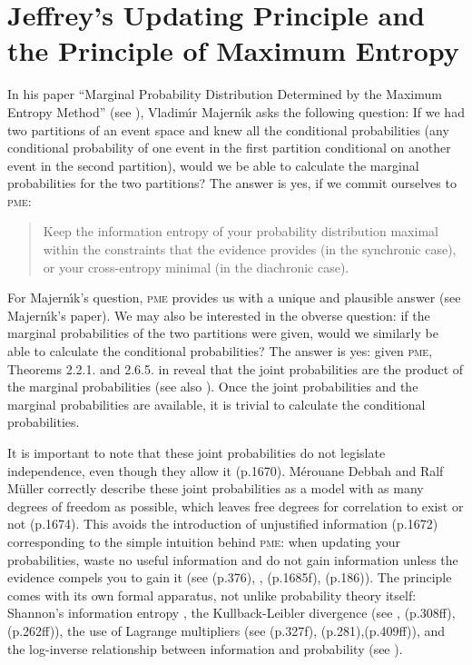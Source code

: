 \documentclass[entropy,article,accept,oneauthor,pdftex,12pt,a4paper]{mdpi}
\newcommand{\qeins}[1]{``#1''}
\newenvironment{quotex}{\begin{quote}\begin{footnotesize}}{\end{footnotesize}\end{quote}}
\begin{document}
\section{Jeffrey's Updating Principle and the Principle of Maximum Entropy}
\label{juppme}

In his paper \qeins{Marginal Probability Distribution Determined by
  the Maximum Entropy Method} (see \cite{ref-21}), Vladim{\'\i}r Majern{\'\i}k
asks the following question: If we had two partitions of an event
space and knew all the conditional probabilities (any conditional
probability of one event in the first partition conditional on another
event in the second partition), would we be able to calculate the
marginal probabilities for the two partitions? The answer is yes, if
we commit ourselves to \textsc{pme}:

\begin{quotex}
  [\textsc{pme}] Keep the information entropy of your probability
  distribution maximal within the constraints that the evidence
  provides (in the synchronic case), or your cross-entropy minimal (in
  the diachronic case).
\end{quotex}

For Majern{\'\i}k's question, \textsc{pme} provides us with a unique
and plausible answer (see Majern{\'\i}k's paper). We may also be
interested in the obverse question: if the marginal probabilities of
the two partitions were given, would we similarly be able to calculate
the conditional probabilities? The answer is yes: given \textsc{pme},
Theorems 2.2.1. and 2.6.5. in  \cite{ref-2} reveal that the joint probabilities
are the product of the marginal probabilities (see also \cite{ref-4}).
Once the joint probabilities and the marginal probabilities are
available, it is trivial to calculate the conditional probabilities.

It is important to note that these joint probabilities do not
legislate independence, even though they allow it \cite{ref-4}
(p.1670). M{\'e}rouane Debbah and Ralf M{\"u}ller correctly describe
these joint probabilities as a model with as many degrees of freedom
as possible, which leaves free degrees for correlation to exist or not
\cite{ref-4}(p.1674). This avoids the introduction of unjustified
information \cite{ref-4}(p.1672) corresponding to the simple intuition
behind \textsc{pme}: when updating your probabilities, waste no useful
information and do not gain information unless the evidence compels
you to gain it (see \cite{ref-30} (p.376), \cite{ref-12,ref-35},
\cite{ref-4} (p.1685f), \cite{ref-22} (p.186)). The principle comes
with its own formal apparatus, not unlike probability theory itself:
Shannon's information entropy \cite{ref-25}, the Kullback-Leibler
divergence (see \cite{ref-20, ref-19}, \cite{ref-7} (p.308ff),
\cite{ref-24}(p.262ff)), the use of Lagrange multipliers (see
\cite{ref-7}(p.327f), \cite{ref-24} (p.281),\cite{ref-2}(p.409ff)), and
the log-inverse relationship between information and probability (see
\cite{ref-17, ref-16, ref-15, ref-18}).
\end{document}
